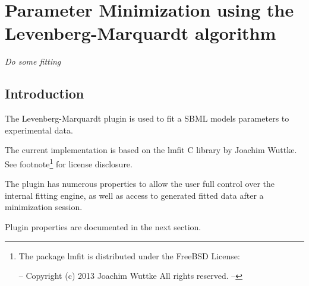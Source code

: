 \chapter{Parameter Minimization using the Levenberg-Marquardt algorithm}
\emph{Do some fitting}
\section{Introduction}
The Levenberg-Marquardt plugin is used to fit a SBML models parameters to experimental data. 

The current implementation is based on the lmfit C library by Joachim Wuttke. See footnote\footnote{The package lmfit is distributed under the FreeBSD License:

--
  Copyright (c) 2013 Joachim Wuttke All rights reserved.
--} for license disclosure.

The plugin has numerous properties to allow the user full control over the internal fitting engine, as well as 
access to generated fitted data after a minimization session. 

Plugin properties are documented in the next section.

